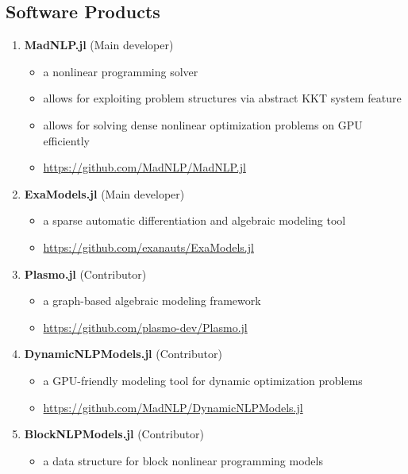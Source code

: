 \subsection*{Software Products}
\begin{enumerate}[itemsep=0pt]
\renewcommand*{\labelenumi}{[S\theenumi]}
\item \textbf{MadNLP.jl} (Main developer)
  \begin{itemize}[leftmargin=*,topsep=0pt,label=$\bullet$,topsep=-5pt,itemsep=-1pt]
  \item a nonlinear programming solver
  \item allows for exploiting problem structures via abstract KKT system feature
  \item allows for solving dense nonlinear optimization problems on GPU efficiently
  \item \url{https://github.com/MadNLP/MadNLP.jl}
\end{itemize}
\item \textbf{ExaModels.jl} (Main developer)
  \begin{itemize}[leftmargin=*,topsep=0pt,label=$\bullet$,topsep=-5pt,itemsep=-1pt]
  \item a sparse automatic differentiation and algebraic modeling tool
  \item \url{https://github.com/exanauts/ExaModels.jl}
  \end{itemize}
\item \textbf{Plasmo.jl} (Contributor)
  \begin{itemize}[leftmargin=*,topsep=0pt,label=$\bullet$,topsep=-5pt,itemsep=-1pt]
  \item a graph-based algebraic modeling framework
  \item \url{https://github.com/plasmo-dev/Plasmo.jl}
  \end{itemize}
\item \textbf{DynamicNLPModels.jl} (Contributor)
  \begin{itemize}[leftmargin=*,topsep=0pt,label=$\bullet$,topsep=-5pt,itemsep=-1pt]
  \item a GPU-friendly modeling tool for dynamic optimization problems
  \item \url{https://github.com/MadNLP/DynamicNLPModels.jl}
  \end{itemize}
\item \textbf{BlockNLPModels.jl} (Contributor)
  \begin{itemize}[leftmargin=*,topsep=0pt,label=$\bullet$,topsep=-5pt,itemsep=-1pt]
  \item a data structure for block nonlinear programming models

\end{itemize}
\end{enumerate}
